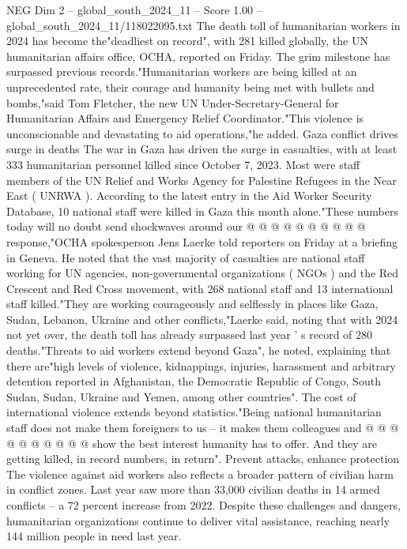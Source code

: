 \begin{textsample}{NEG Dim 2 – global\_south\_2024\_11 – Score 1.00 – global\_south\_2024\_11/118022095.txt}  \label{ex:f2_neg_264}
The death toll of humanitarian workers in 2024 has become the"deadliest on record", with 281 killed globally, the UN humanitarian affairs office, OCHA, reported on Friday.
The grim milestone has surpassed previous records."Humanitarian workers are being killed at an unprecedented rate, their courage and humanity being met with bullets and bombs,"said Tom Fletcher, the new UN Under-Secretary-General for Humanitarian Affairs and Emergency Relief Coordinator."This violence is unconscionable and devastating to aid operations,"he added.
Gaza conflict drives surge in deaths The war in Gaza has driven the surge in casualties, with at least 333 humanitarian personnel killed since October 7, 2023.
Most were staff members of the UN Relief and Works Agency for Palestine Refugees in the Near East ( UNRWA ).
According to the latest entry in the Aid Worker Security Database, 10 national staff were killed in Gaza this month alone."These numbers today will no doubt send shockwaves around our @ @ @ @ @ @ @ @ @ @ response,"OCHA spokesperson Jens Laerke told reporters on Friday at a briefing in Geneva.
He noted that the vast majority of casualties are national staff working for UN agencies, non-governmental organizations ( NGOs ) and the Red Crescent and Red Cross movement, with 268 national staff and 13 international staff killed."They are working courageously and selflessly in places like Gaza, Sudan, Lebanon, Ukraine and other conflicts,"Laerke said, noting that with 2024 not yet over, the death toll has already surpassed last year ' s record of 280 deaths."Threats to aid workers extend beyond Gaza", he noted, explaining that there are"high levels of violence, kidnappings, injuries, harassment and arbitrary detention reported in Afghanistan, the Democratic Republic of Congo, South Sudan, Sudan, Ukraine and Yemen, among other countries".
The cost of international violence extends beyond statistics."Being national humanitarian staff does not make them foreigners to us -- it makes them colleagues and @ @ @ @ @ @ @ @ @ @ show the best interest humanity has to offer.
And they are getting killed, in record numbers, in return".
Prevent attacks, enhance protection The violence against aid workers also reflects a broader pattern of civilian harm in conflict zones.
Last year saw more than 33,000 civilian deaths in 14 armed conflicts -- a 72 percent increase from 2022.
Despite these challenges and dangers, humanitarian organizations continue to deliver vital assistance, reaching nearly 144 million people in need last year.

\end{textsample}
